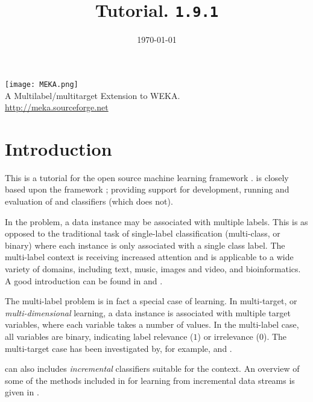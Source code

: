 \documentclass[11pt]{article}
\newcommand{\MEKA}{Meka}
\newcommand{\WEKA}{Weka}
\def\version{{\tt 1.9.1}}
\begin{document}
\title{Tutorial. \framework{\MEKA} \version }


\date{\mydate\today}

\maketitle

\begin{center}
	\texttt{[image: MEKA.png]}\\
		A Multilabel/multitarget Extension to WEKA.\\
		\url{http://meka.sourceforge.net}
\end{center}

\tableofcontents

\thispagestyle{empty}
\pagebreak

\section{Introduction}

This is a tutorial for the open source machine learning framework \framework{\MEKA}. \framework{\MEKA} is closely based upon the \framework{\WEKA} framework \cite{WEKA}; providing support for development, running and evaluation of  and  classifiers (which  does not).

In the  problem, a data instance may be associated with multiple labels. This is as opposed to the traditional task of single-label classification (\ie multi-class, or binary) where each instance is only associated with a single class label. The multi-label context is receiving increased attention and is applicable to a wide variety of domains, including text, music, images and video, and bioinformatics. A good introduction can be found in \cite{MMD} and \cite{Thesis}.

The multi-label problem is in fact a special case of  learning. In multi-target, or \textit{multi-dimensional} learning, a data instance is associated with multiple target variables, where each variable takes a number of values. In the multi-label case, all variables are binary, indicating label relevance ($1$) or irrelevance ($0$). The multi-target case has been investigated by, for example, \cite{UPM} and \cite{MT}.  

\framework{\MEKA} can also includes \emph{incremental} classifiers suitable for the  context. An overview of some of the methods included in \framework{\MEKA} for learning from incremental data streams is given in \cite{MEDS2}.
\end{document}
